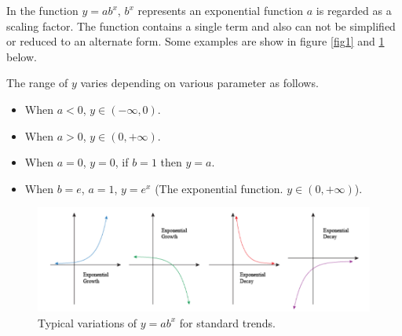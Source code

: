 \documentclass[11pt]{article}
\begin{document}
In the function $y=ab^x$, $b^x$ represents an exponential function $a$ is regarded as a scaling factor. The function contains a single term and also can not be simplified or reduced to an alternate form. Some examples are show in figure \ref{fig1} and \ref{fig2} below. 
\par
The range of $y$ varies depending on various parameter as follows.
\begin{itemize}
	\item When $a<0$, $y\in(-\infty, 0)$.
	\item When $a>0$, $y\in(0, +\infty)$.
	\item When $a=0$, $y=0$, if $b=1$ then $y=a$.
	\item When $b=e$, $a=1$, $y=e^x$ (The exponential function. $y\in(0, +\infty)$).
\end{itemize}


\begin{figure}[H]
	\centering
	\includegraphics[width=\linewidth]{Figures/graph}
	\caption{Typical variations of $y=ab^x$ for standard trends.}
	\label{fig2}
\end{figure}
\end{document}
